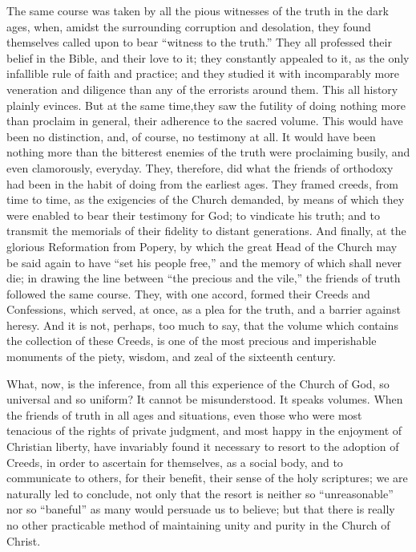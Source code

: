 \documentclass[
]{book}
\begin{document}
The same course was taken by all the pious witnesses of the truth in the dark ages, when, amidst the surrounding corruption and desolation, they found themselves called upon to bear ``witness to the truth.'' They all professed their belief in the Bible, and their love to it; they constantly appealed to it, as the only infallible rule of faith and practice; and they studied it with incomparably more veneration and diligence than any of the errorists around them. This all history plainly evinces. But at the same time,they saw the futility of doing nothing more than proclaim in general, their adherence to the sacred volume. This would have been no distinction, and, of course, no testimony at all. It would have been nothing more than the bitterest enemies of the truth were proclaiming busily, and even clamorously, everyday. They, therefore, did what the friends of orthodoxy had been in the habit of doing from the earliest ages. They framed creeds, from time to time, as the exigencies of the Church demanded, by means of which they were enabled to bear their testimony for God; to vindicate his truth; and to transmit the memorials of their fidelity to distant generations. And finally, at the glorious Reformation from Popery, by which the great Head of the Church may be said again to have ``set his people free,'' and the memory of which shall never die; in drawing the line between ``the precious and the vile,'' the friends of truth followed the same course. They, with one accord, formed their Creeds and Confessions, which served, at once, as a plea for the truth, and a barrier against heresy. And it is not, perhaps, too much to say, that the volume which contains the collection of these Creeds, is one of the most precious and imperishable monuments of the piety, wisdom, and zeal of the sixteenth century.

What, now, is the inference, from all this experience of the Church of God, so universal and so uniform? It cannot be misunderstood. It speaks volumes. When the friends of truth in all ages and situations, even those who were most tenacious of the rights of private judgment, and most happy in the enjoyment of Christian liberty, have invariably found it necessary to resort to the adoption of Creeds, in order to ascertain for themselves, as a social body, and to communicate to others, for their benefit, their sense of the holy scriptures; we are naturally led to conclude, not only that the resort is neither so ``unreasonable'' nor so ``baneful'' as many would persuade us to believe; but that there is really no other practicable method of maintaining unity and purity in the Church of Christ.
\end{document}
